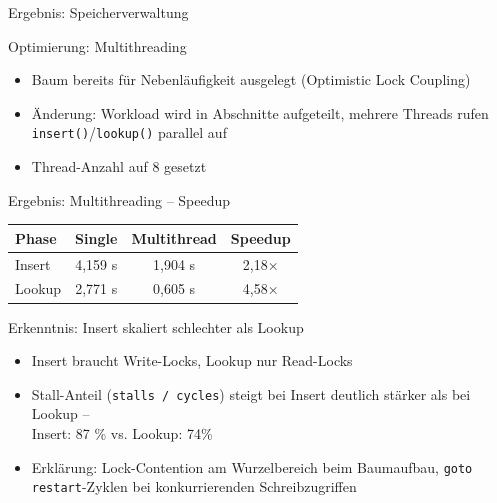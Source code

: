 \documentclass[aspectratio=169,13pt]{beamer}
\begin{document}
	\begin{frame}{Ergebnis: Speicherverwaltung}
		\centering
	\end{frame}
	
	
	\begin{frame}{Optimierung: Multithreading}
		\begin{itemize}
			\item Baum bereits für Nebenläufigkeit ausgelegt (Optimistic Lock Coupling)
			\item Änderung: Workload wird in Abschnitte aufgeteilt, mehrere Threads
			rufen \texttt{insert()}/\texttt{lookup()} parallel auf
			\item Thread-Anzahl auf 8 gesetzt
		\end{itemize}
	\end{frame}
	
	\begin{frame}{Ergebnis: Multithreading -- Speedup}
		\centering
		\begin{table}
			\begin{tabular}{lccc}
				\toprule
				Phase & Single & Multithread & Speedup \\
				\midrule
				Insert & 4,159 s & 1,904 s & 2,18$\times$ \\
				Lookup & 2,771 s & 0,605 s & 4,58$\times$ \\
				\bottomrule
			\end{tabular}
		\end{table}
	\end{frame}
	
	\begin{frame}{Erkenntnis: Insert skaliert schlechter als Lookup}
		\begin{itemize}
			\item Insert braucht Write-Locks, Lookup nur Read-Locks
			\item Stall-Anteil (\texttt{stalls / cycles}) steigt bei Insert deutlich
			stärker als bei Lookup --\\
			Insert: 87 \% vs. Lookup: 74\%
			\item Erklärung: Lock-Contention am Wurzelbereich beim Baumaufbau,
			\texttt{goto restart}-Zyklen bei konkurrierenden Schreibzugriffen
		\end{itemize}	
	\end{frame}
	
\end{document}
